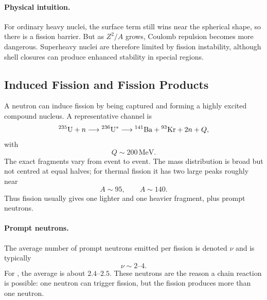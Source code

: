 \paragraph{Physical intuition.}
For ordinary heavy nuclei, the surface term still wins near the spherical shape,
so there is a fission barrier. But as $Z^2/A$ grows, Coulomb repulsion becomes
more dangerous. Superheavy nuclei are therefore limited by fission instability,
although shell closures can produce enhanced stability in special regions.

\subsection{Induced Fission and Fission Products}
\label{subsec:lec11:induced_fission}

A neutron can induce fission by being captured and forming a highly excited
compound nucleus. A representative channel is
\begin{equation}
  \nucleus{U}{235}+n\longrightarrow \nucleus{U}{236}^{\ast}
  \longrightarrow \nucleus{Ba}{141}+\nucleus{Kr}{93}+2n+Q,
  \label{eq:lec11:u235_fission_example}
\end{equation}
with
\begin{equation}
  Q\sim 200\,\mathrm{MeV}.
\end{equation}
The exact fragments vary from event to event. The mass distribution is broad but
not centred at equal halves; for  thermal fission it has two
large peaks roughly near
\begin{equation}
  A\sim 95,
  \qquad
  A\sim 140.
\end{equation}
Thus fission usually gives one lighter and one heavier fragment, plus prompt
neutrons.

\paragraph{Prompt neutrons.}
The average number of prompt neutrons emitted per fission is denoted $\nu$ and
is typically
\begin{equation}
  \boxed{\nu\sim2\text{--}4.}
\end{equation}
For , the average is about $2.4$--$2.5$. These neutrons are the
reason a chain reaction is possible: one neutron can trigger fission, but the
fission produces more than one neutron.

